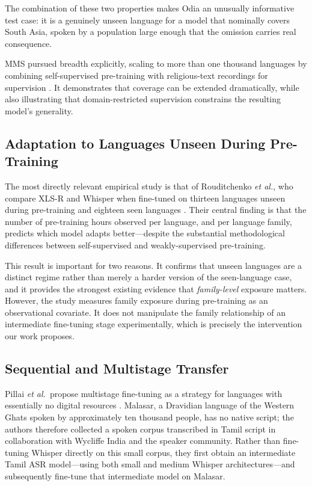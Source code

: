 \documentclass[conference]{IEEEtran}
\begin{document}
The combination of these two properties makes Odia an unusually
informative test case: it is a genuinely unseen language for a model
that nominally covers South Asia, spoken by a population large enough
that the omission carries real consequence.

MMS pursued breadth explicitly, scaling to more than one thousand
languages by combining self-supervised pre-training with religious-text
recordings for supervision \cite{pratap2024mms}. It demonstrates that
coverage can be extended dramatically, while also illustrating that
domain-restricted supervision constrains the resulting model's
generality.

\subsection{Adaptation to Languages Unseen During Pre-Training}

The most directly relevant empirical study is that of Rouditchenko
\emph{et al.}, who compare XLS-R and Whisper when fine-tuned on
thirteen languages unseen during pre-training and eighteen seen
languages \cite{rouditchenko2023unseen}. Their central finding is that
the number of pre-training hours observed per language, and per language
family, predicts which model adapts better---despite the substantial
methodological differences between self-supervised and weakly-supervised
pre-training.

This result is important for two reasons. It confirms that unseen
languages are a distinct regime rather than merely a harder version of
the seen-language case, and it provides the strongest existing evidence
that \emph{family-level} exposure matters. However, the study measures
family exposure during pre-training as an observational covariate. It
does not manipulate the family relationship of an intermediate
fine-tuning stage experimentally, which is precisely the intervention
our work proposes.

\subsection{Sequential and Multistage Transfer}

Pillai \emph{et al.}\ propose multistage fine-tuning as a strategy for
languages with essentially no digital resources \cite{pillai2024multistage}.
Malasar, a Dravidian language of the Western Ghats spoken by
approximately ten thousand people, has no native script; the authors
therefore collected a spoken corpus transcribed in Tamil script in
collaboration with Wycliffe India and the speaker community. Rather than
fine-tuning Whisper directly on this small corpus, they first obtain an
intermediate Tamil ASR model---using both small and medium Whisper
architectures---and subsequently fine-tune that intermediate model on
Malasar.
\end{document}
